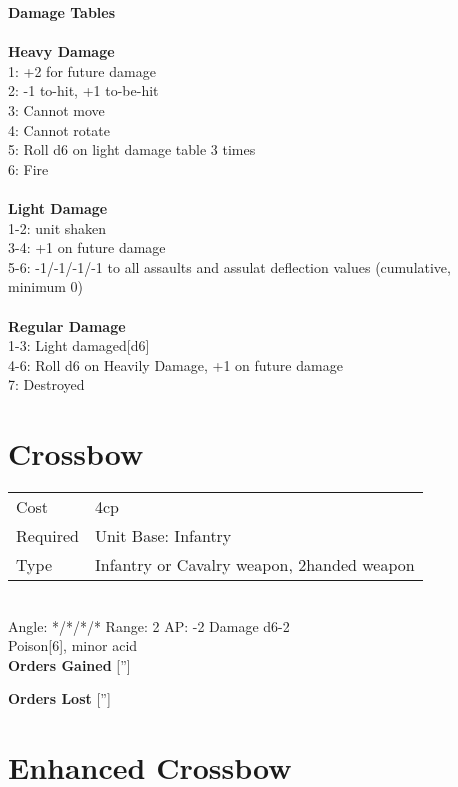 {\bf Damage Tables} \\
\ \\ {\bf Heavy Damage } \\
1: +2 for future damage \\
2: -1 to-hit, +1 to-be-hit \\
3: Cannot move \\
4: Cannot rotate \\
5: Roll d6 on light damage table 3 times \\
6: Fire \\
\ \\ {\bf Light Damage } \\
1-2: unit shaken \\
3-4: +1 on future damage \\
5-6: -1/-1/-1/-1 to all assaults and assulat deflection values (cumulative, minimum 0) \\
\ \\ {\bf Regular Damage } \\
1-3: Light damaged[d6] \\
4-6: Roll d6 on Heavily Damage, +1 on future damage \\
7: Destroyed \\









\pagebreak\section{ Crossbow }

\begin{tabular}{ll}
    Cost & 4cp \\
    Required & Unit Base: Infantry\\
    Type & Infantry or Cavalry weapon, 2handed weapon\\
\end{tabular}
\ \\
\indent Angle: */*/*/* Range: 2  AP: -2 Damage d6-2 \\
Poison[6], minor acid
\ \\

{\bf Orders Gained}
['']

{\bf Orders Lost}
['']
\section{ Enhanced Crossbow }

